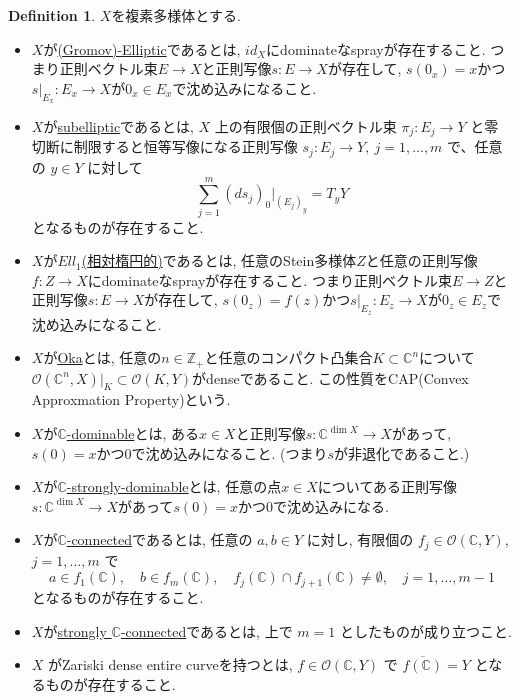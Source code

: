 \documentclass[dvipdfmx,a4paper,11pt]{article} %
\theoremstyle{definition}
\newtheorem{defn}[thm]{Definition}
\theoremstyle{remark}
\numberwithin{equation}{section}
\newcommand{\N}{\mathbb{Z}_+}
\newcommand{\C}{\mathbb{C}}
\begin{document}
\begin{defn}
$X$を複素多様体とする. 
\begin{itemize}
  \setlength{\parskip}{0cm} %
  \setlength{\itemsep}{0cm} %
\item $X$が\underline{(Gromov)-Elliptic}であるとは, $id_X$にdominateなsprayが存在すること. つまり正則ベクトル束$E \to X$と正則写像$s:E \to X$が存在して, $s(0_x)=x$かつ$s|_{E_x} : E_x \to X$が$0_x \in E_x$で沈め込みになること.
\item $X$が\underline{subelliptic}であるとは, $X$ 上の有限個の正則ベクトル束 $\pi_j : E_j \to Y$ と零切断に制限すると恒等写像になる正則写像 $s_j : E_j \to Y,\ j = 1, \dots, m$ で、任意の $y \in Y$ に対して
  \[
  \sum_{j=1}^{m} (ds_j)_0|_{(E_j)_y} = T_y Y
  \]
  となるものが存在すること.
\medskip
\item  $X$が\underline{$Ell_1$(相対楕円的)}であるとは, 任意のStein多様体$Z$と任意の正則写像$f :  Z \to X$にdominateなsprayが存在すること. つまり正則ベクトル束$E \to Z$と正則写像$s:E \to X$が存在して, $s(0_z)=f(z)$かつ$s|_{E_z} : E_z \to X$が$0_z \in E_z$で沈め込みになること.
\item $X$が\underline{Oka}とは, 任意の$n \in \N$と任意のコンパクト凸集合$K \subset \C^n$について$\mathcal{O}(\C^n, X)|_{K} \subset \mathcal{O}(K,Y)$がdenseであること. この性質をCAP(Convex Approxmation Property)という.
\medskip
\item $X$が\underline{$\C$-dominable}とは, ある$x \in X$と正則写像$s : \C^{\dim X} \to X$があって, $s(0)=x$かつ$0$で沈め込みになること. (つまり$s$が非退化であること.) 
\item $X$が\underline{$\C$-strongly-dominable}とは, 任意の点$x \in X$についてある正則写像$s : \C^{\dim X} \to X$があって$s(0)=x$かつ$0$で沈め込みになる. 
\medskip
\item $X$が\underline{$\C$-connected}であるとは, 任意の $a, b \in Y$ に対し, 有限個の $f_j \in \mathcal{O}(\mathbb{C}, Y)$, $j = 1, \dots, m$ で
  \[
  a \in f_1(\mathbb{C}), \quad b \in f_m(\mathbb{C}), \quad f_j(\mathbb{C}) \cap f_{j+1}(\mathbb{C}) \neq \emptyset, \quad j = 1, \dots, m-1
  \]
  となるものが存在すること. %
  \item $X$が\underline{strongly $\C$-connected}であるとは, 上で $m=1$ としたものが成り立つこと.
  \item$X$ がZariski dense entire curveを持つとは, $f \in \mathcal{O}(\mathbb{C}, Y)$ で $\overline{f(\mathbb{C})} = Y$ となるものが存在すること. 
\end{itemize}
\end{defn}
\end{document}
